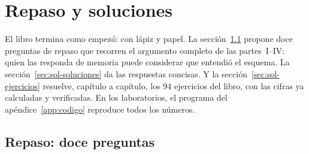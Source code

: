 \documentclass[11pt,a4paper,oneside]{report}
\begin{document}

\chapter{Repaso y soluciones}\label{ch:soluciones}

\begin{roadmap}
El libro termina como empezó: con lápiz y papel. La
sección~\ref{sec:sol-repaso} propone doce preguntas de repaso que
recorren el argumento completo de las partes~I--IV: quien las
responda de memoria puede considerar que entendió el esquema. La
sección~\ref{sec:sol-soluciones} da las respuestas concisas. Y la
sección~\ref{sec:sol-ejercicios} resuelve, capítulo a capítulo, los
$94$ ejercicios del libro, con las cifras ya calculadas y
verificadas. En los laboratorios, el programa del
apéndice~\ref{app:codigo} reproduce todos los números.
\end{roadmap}

\section{Repaso: doce preguntas}\label{sec:sol-repaso}
\end{document}
